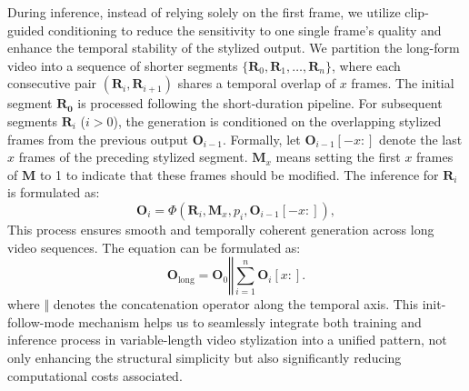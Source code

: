 \documentclass[runningheads]{llncs}
\begin{document}
During inference, instead of relying solely on the first frame, we utilize clip-guided conditioning to reduce the sensitivity to one single frame's quality and enhance the temporal stability of the stylized output. We partition the long-form video into a sequence of shorter segments $\{\mathbf{R}_{0}, \mathbf{R}_{1}, \dots, \mathbf{R}_{n}\}$, where each consecutive pair $(\mathbf{R}_{i}, \mathbf{R}_{i+1})$ shares a temporal overlap of $x$ frames.
The initial segment $\mathbf{R}_{\mathbf{0}}$ is processed following the short-duration pipeline. 
For subsequent segments $\mathbf{R}_{i}$ ($i > 0$), the generation is conditioned on the overlapping stylized frames from the previous output $\mathbf{O}_{i-1}$. 
Formally, let $\mathbf{O}_{i-1}[-x:]$ denote the last $x$ frames of the preceding stylized segment. $\mathbf{M}_x$ means setting the first $x$ frames of $\textbf{M}$ to 1 to indicate that these frames should be modified. The inference for $\mathbf{R}_{i}$ is formulated as:
\begin{equation}
    \mathbf{O}_{i} = \Phi(\mathbf{R}_{i},\mathbf{M}_x, p_{i}, \mathbf{O}_{i-1}[-x:]),
\end{equation}
This process ensures smooth and temporally coherent generation across long video sequences. The equation can be formulated as:
\begin{equation}
\mathbf{O}_{\text{long}} = \mathbf{O}_0 \mathbin{\Vert} \sum_{i=1}^{n} \mathbf{O}_i[x:].
\end{equation}
where $\mathbin{\Vert}$ denotes the concatenation operator along the temporal axis. This init-follow-mode mechanism helps us to seamlessly integrate both training and inference process in variable-length video stylization into a unified pattern, not only enhancing the structural simplicity but also significantly reducing computational costs associated.
    


\end{document}
